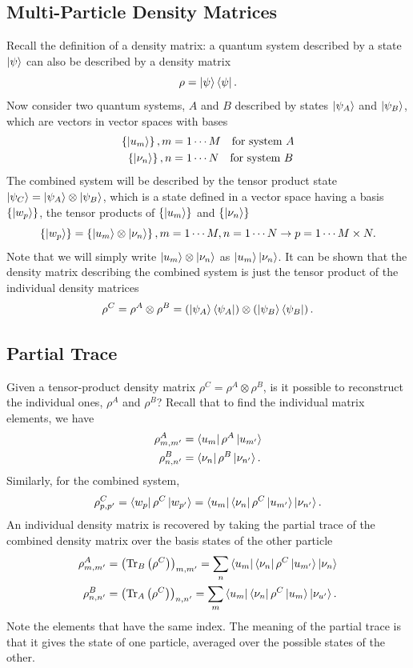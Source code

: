 \documentclass{article}
\begin{document}
\subsection{Multi-Particle Density Matrices}
Recall the definition of a density matrix: a quantum system described by a state $\ket{\psi }$ can also be described by a density matrix 
\[
    \rho =\ket{\psi }\bra{\psi }.
\]
Now consider two quantum systems, $A$ and $B$ described by states $\ket{\psi _A}$ and $\ket{\psi _B}$, which are vectors in vector spaces with bases
\begin{align*}
    \left\{ \ket{u_m} \right\},m &= 1\cdots M \quad \text{for system }A\\
    \left\{ \ket{\nu _n} \right\},n&=1 \cdots N\quad \text{for system }B
\end{align*}
The combined system will be described by the tensor product state $\ket{\psi _C}=\ket{\psi _A}\otimes \ket{\psi _B}$, which is a state defined in a vector space having a basis $\left\{ \ket{w_p} \right\}$, the tensor products of $\left\{ \ket{u_m} \right\}$ and $\left\{ \ket{\nu _n} \right\}$
\[
    \left\{ \ket{w_p} \right\}=\left\{ \ket{u_m}\otimes \ket{\nu _n} \right\}, m=1\cdots M,n=1\cdots N\to p=1\cdots M\times N.
\]
Note that we will simply write $\ket{u_m}\otimes \ket{\nu _n}$ as $\ket{u_m}\ket{\nu _n}$. It can be shown that the density matrix describing the combined system is just the tensor product of the individual density matrices 
\[
    \rho ^C=\rho^A\otimes \rho ^B=\left( \ket{\psi _A} \bra{\psi _A}\right)\otimes \left( \ket{\psi _B}\bra{\psi _B} \right).
\]

\subsection{Partial Trace}
Given a tensor-product density matrix $\rho ^C=\rho ^A\otimes \rho ^B$, is it possible to reconstruct the individual ones, $\rho ^A$ and $\rho ^B$? Recall that to find the individual matrix elements, we have
\begin{align*}
    \rho ^A_{m,m'} &= \bra{u_m}\rho ^A \ket{u_{m'}}\\
    \rho ^B_{n,n'} &= \bra{\nu _n}\rho ^B \ket{\nu _{n'}}.
\end{align*}
Similarly, for the combined system,
\[
    \rho ^C_{p,p'}=\bra{w_p}\rho ^C \ket{w_{p'}}=\bra{u_m}\bra{\nu _n}\rho ^C \ket{u_{m'}}\ket{\nu _{n'}}.
\]
An individual density matrix is recovered by taking the partial trace of the combined density matrix over the basis states of the other particle
\begin{align*}
    \rho ^A_{m,m'} &= \left( \text{Tr}_B \left( \rho ^C \right) \right)_{m,m'}=\sum_{n}\bra{u_m}\bra{\nu _n}\rho ^C \ket{u_{m'}}\ket{\nu _n}\\
    \rho ^B_{n,n'}&=\left( \text{Tr}_A \left( \rho ^C \right) \right)_{n,n'}=\sum_{m}\bra{u_m}\bra{\nu _n}\rho ^C \ket{u_m}\ket{\nu _{u'}}.
\end{align*}
Note the elements that have the same index. The meaning of the partial trace is that it gives the state of one particle, averaged over the possible states of the other.
\end{document}

